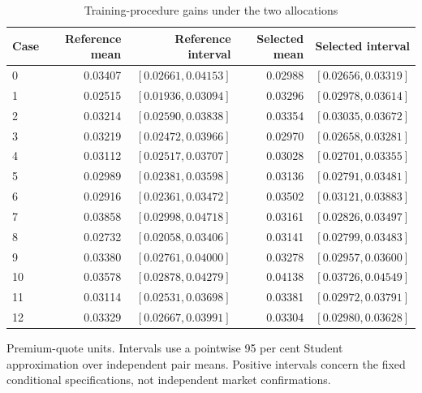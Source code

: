 \documentclass[11pt]{article}
\begin{document}
\begin{table}[htbp]
\centering\small
\caption{Training-procedure gains under the two allocations}\label{tab:allocation-gains}
\setlength{\tabcolsep}{4pt}
\begin{tabular}{lrrrr}
\toprule
Case & Reference mean & Reference interval & Selected mean & Selected interval \\
\midrule
0 & 0.03407 & $[0.02661,0.04153]$ & 0.02988 & $[0.02656,0.03319]$ \\
1 & 0.02515 & $[0.01936,0.03094]$ & 0.03296 & $[0.02978,0.03614]$ \\
2 & 0.03214 & $[0.02590,0.03838]$ & 0.03354 & $[0.03035,0.03672]$ \\
3 & 0.03219 & $[0.02472,0.03966]$ & 0.02970 & $[0.02658,0.03281]$ \\
4 & 0.03112 & $[0.02517,0.03707]$ & 0.03028 & $[0.02701,0.03355]$ \\
5 & 0.02989 & $[0.02381,0.03598]$ & 0.03136 & $[0.02791,0.03481]$ \\
6 & 0.02916 & $[0.02361,0.03472]$ & 0.03502 & $[0.03121,0.03883]$ \\
7 & 0.03858 & $[0.02998,0.04718]$ & 0.03161 & $[0.02826,0.03497]$ \\
8 & 0.02732 & $[0.02058,0.03406]$ & 0.03141 & $[0.02799,0.03483]$ \\
9 & 0.03380 & $[0.02761,0.04000]$ & 0.03278 & $[0.02957,0.03600]$ \\
10 & 0.03578 & $[0.02878,0.04279]$ & 0.04138 & $[0.03726,0.04549]$ \\
11 & 0.03114 & $[0.02531,0.03698]$ & 0.03381 & $[0.02972,0.03791]$ \\
12 & 0.03329 & $[0.02667,0.03991]$ & 0.03304 & $[0.02980,0.03628]$ \\
\bottomrule
\end{tabular}
\par\smallskip\begin{minipage}{\textwidth}\footnotesize Premium-quote units. Intervals use a pointwise 95 per cent Student approximation over independent pair means. Positive intervals concern the fixed conditional specifications, not independent market confirmations.\end{minipage}
\end{table}
\end{document}
